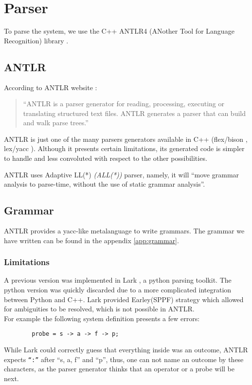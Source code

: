\section{Parser}
        To parse the system, we use the C++ ANTLR4 (ANother Tool for Language Recognition) library \cite{antlr4}. 
        \subsection{ANTLR}
    According to ANTLR website \cite{antlr4}: 
    \begin{quote}
        ``ANTLR is a parser generator for reading, processing, executing or translating structured text files. ANTLR generates a parser that can build and walk parse trees.''
    \end{quote}

 ANTLR is just one of the many parsers generators available in C++ (flex/bison \cite{flexb}, lex/yacc \cite{lexy}). Although it presents certain limitations, its generated code is simpler to handle and less convoluted with respect to the other possibilities.

        ANTLR uses Adaptive LL(*) \textit{(ALL(*))} parser, namely, it will ``move grammar analysis to parse-time, without the use of static grammar analysis''. \cite{antlr}

        \subsection{Grammar}
            ANTLR provides a yacc-like metalanguage \cite{antlr} to write grammars. The grammar we have written can be found in the appendix \cref{app:grammar}.
              
    \subsubsection{Limitations}
        A previous version was implemented in Lark \cite{lark}, a python parsing toolkit. The python version was quickly discarded due to a more complicated integration between Python and C++. Lark provided Earley(SPPF) strategy which allowed for ambiguities to be resolved, which is not possible in ANTLR. \\
        For example the following system definition presents a few errors:
        \begin{verbatim}
        probe = s -> a -> f -> p;
        \end{verbatim}
    While Lark could correctly guess that everything inside was an outcome, ANTLR expects \texttt{``:''} after ``s, a, f'' and ``p'', thus, one can not name an outcome by these characters, as the parser generator thinks that an operator or a probe will be next. 
